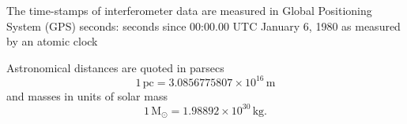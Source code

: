\documentclass[12pt,notitlepage]{report}
\begin{document}
\vspace{0.5cm}

\noindent The time-stamps of interferometer data are measured in Global
Positioning System (GPS) seconds: seconds since 00:00.00 UTC January 6, 1980
as measured by an atomic clock

\vspace{0.5cm}

\noindent Astronomical distances are quoted in parsecs
\begin{equation}
1\,\mathrm{pc} = 3.0856775807 \times 10^{16}\,\mathrm{m}
\end{equation}
and masses in units of solar mass
\begin{equation}
1\,\mathrm{M}_\odot = 1.98892 \times 10^{30}\,\mathrm{kg}.
\end{equation}

\afterpreface

\label{ch:introduction}

\label{ch:inspiral}

\label{ch:macho}

\label{ch:findchirp}

\label{ch:pipeline}

\label{ch:hardware}

%
\label{ch:result}

\label{ch:conclusion}


\clearpage



\clearpage
{}

\begin{startvita}
\end{startvita}

\renewenvironment{thebibliography}[1]%
  {\begin{list}{\labelenumi\hss}%
     {\usecounter{enumi}\setlength{\labelwidth}{3em}%
      \setlength{\leftmargin}{5em}}}%
  {\end{list}}
\renewcommand{\bibitem}[1]{\item\label{#1}\relax}%
\renewcommand{\theenumi}{\arabic{enumi}}%
\begin{publications}
\putbib[papers]
\end{publications}

\finishvita
\end{document}
